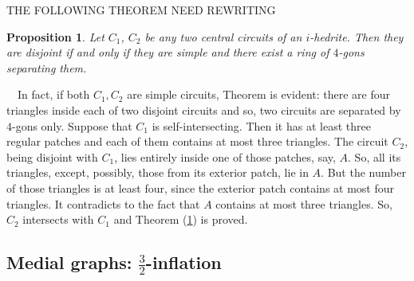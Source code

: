\documentclass[12pt]{article}
\newtheorem{proposition}{Proposition}
\newtheorem{claim}{Claim}
\newcommand{\proof}{\noindent{\bf Proof.}\ \ }
\begin{document}
THE FOLLOWING THEOREM NEED REWRITING
\begin{proposition}\label{intersec}
Let $C_1$, $C_2$ be any two central circuits of an $i$-hedrite. Then 
they are disjoint if and only if they are simple and there exist a 
ring of $4$-gons separating them.

\end{proposition}
\proof In fact, if both $C_1,C_2$ are simple circuits, Theorem is evident:
there are four triangles inside each of two disjoint circuits and so, two
circuits are separated by $4$-gons only. Suppose that $C_1$ is 
self-intersecting. Then it has at least three regular patches and each 
of them contains at most three triangles. 
The circuit $C_2$, being disjoint with $C_1$, lies entirely inside one 
of those patches, say, $A$. So, all its triangles, except, possibly, 
those from its exterior patch, lie
in $A$. But the number of those triangles is at least four, since the exterior
patch contains at most four triangles. It contradicts to the fact that $A$
contains at most three triangles. So, $C_2$ intersects with $C_1$ and 
Theorem (\ref{intersec}) is proved.


%
%
%
%
%
%






\subsection{Medial graphs: $\frac{3}{2}$-inflation}
\end{document}
